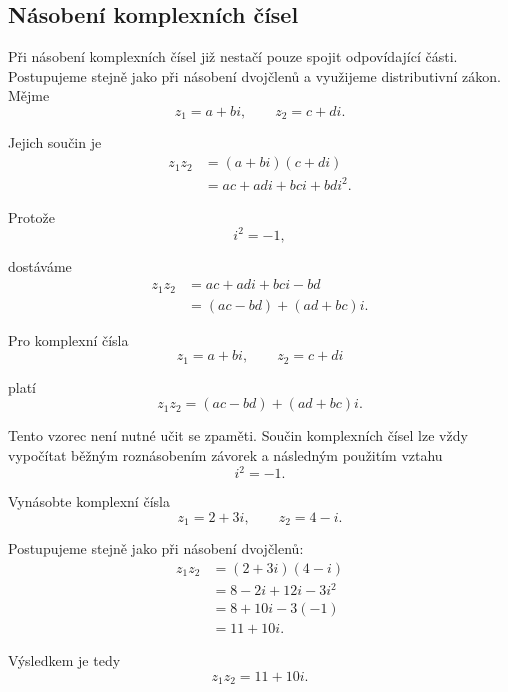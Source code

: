 \documentclass[12pt,a4paper]{article}
\begin{document}
\subsection{Násobení komplexních čísel}
Při násobení komplexních čísel již nestačí pouze spojit odpovídající části.
Postupujeme stejně jako při násobení dvojčlenů a využijeme distributivní zákon.
Mějme
\[
    z_1=a+bi,
    \qquad
    z_2=c+di.
\]

Jejich součin je
\begin{align*}
    z_1z_2  &= (a+bi)(c+di)\\
            &= ac+adi+bci+bdi^2.
\end{align*}

Protože
\[
    i^2=-1,
\]

dostáváme
\begin{align*}
    z_1z_2  &= ac+adi+bci-bd\\
            &= (ac-bd)+(ad+bc)i.
\end{align*}

\begin{definitionbox}
    Pro komplexní čísla
    \[
        z_1=a+bi,
        \qquad
        z_2=c+di
    \]

    platí
    \[
        z_1z_2
        =
        (ac-bd)+(ad+bc)i.
    \]    
\end{definitionbox}

Tento vzorec není nutné učit se zpaměti. 
Součin komplexních čísel lze vždy vypočítat běžným roznásobením závorek 
a následným použitím vztahu
\[
    i^2=-1.
\]

\begin{examplebox}
    Vynásobte komplexní čísla
    \[
        z_1=2+3i, \qquad z_2=4-i.
    \]

    Postupujeme stejně jako při násobení dvojčlenů:
    \begin{align*}
        z_1z_2  &= (2+3i)(4-i) \\
                &= 8-2i+12i-3i^2 \\
                &= 8+10i-3(-1) \\
                &= 11+10i.
    \end{align*}

    Výsledkem je tedy
    \[
        z_1z_2=11+10i.
    \]
\end{examplebox}
\end{document}
